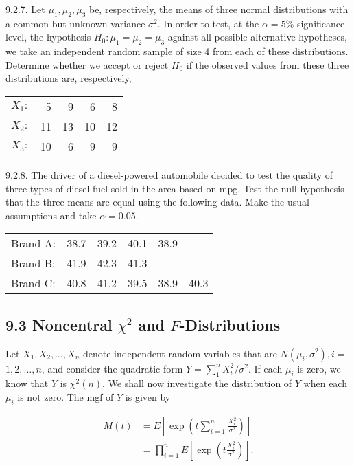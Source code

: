 9.2.7. Let $\mu_{1}, \mu_{2}, \mu_{3}$ be, respectively, the means of three normal distributions with a common but unknown variance $\sigma^{2}$. In order to test, at the $\alpha=5 \%$ significance level, the hypothesis $H_{0}: \mu_{1}=\mu_{2}=\mu_{3}$ against all possible alternative hypotheses, we take an independent random sample of size 4 from each of these distributions. Determine whether we accept or reject $H_{0}$ if the observed values from these three distributions are, respectively,

\begin{center}
\begin{tabular}{rrrrr}
$X_{1}:$ & 5 & 9 & 6 & 8 \\
$X_{2}:$ & 11 & 13 & 10 & 12 \\
$X_{3}:$ & 10 & 6 & 9 & 9 \\
\end{tabular}
\end{center}

9.2.8. The driver of a diesel-powered automobile decided to test the quality of three types of diesel fuel sold in the area based on mpg. Test the null hypothesis that the three means are equal using the following data. Make the usual assumptions and take $\alpha=0.05$.

\begin{center}
\begin{tabular}{llllll}
Brand A: & 38.7 & 39.2 & 40.1 & 38.9 &  \\
Brand B: & 41.9 & 42.3 & 41.3 &  &  \\
Brand C: & 40.8 & 41.2 & 39.5 & 38.9 & 40.3 \\
\end{tabular}
\end{center}

\subsection*{9.3 Noncentral $\chi^{2}$ and $F$-Distributions}
Let $X_{1}, X_{2}, \ldots, X_{n}$ denote independent random variables that are $N\left(\mu_{i}, \sigma^{2}\right), i=$ $1,2, \ldots, n$, and consider the quadratic form $Y=\sum_{1}^{n} X_{i}^{2} / \sigma^{2}$. If each $\mu_{i}$ is zero, we know that $Y$ is $\chi^{2}(n)$. We shall now investigate the distribution of $Y$ when each $\mu_{i}$ is not zero. The mgf of $Y$ is given by

$$
\begin{aligned}
M(t) & =E\left[\exp \left(t \sum_{i=1}^{n} \frac{X_{i}^{2}}{\sigma^{2}}\right)\right] \\
& =\prod_{i=1}^{n} E\left[\exp \left(t \frac{X_{i}^{2}}{\sigma^{2}}\right)\right] .
\end{aligned}
$$

